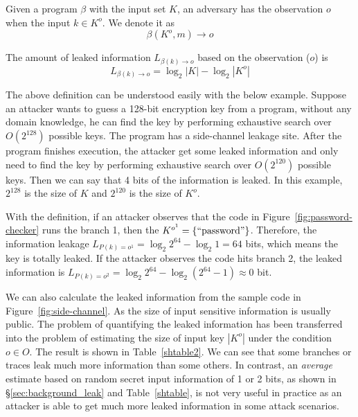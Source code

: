 \begin{mydef}
    \label{def}
    Given a program $\beta$ with the input set $K$,
    an adversary has the observation $o$ when the input $k{\in}K^o$.
    We denote it as
    $$\beta(K^o, m) \rightarrow	o$$

    The amount of leaked information $L_{\beta(k)\rightarrow o}$ based on the observation ($o$) is
    $$L_{\beta(k)\rightarrow o} = \log_2{|K|} - \log_2{|K^o|}$$
\end{mydef}

The above definition can be understood easily with the below example. Suppose an attacker
wants to guess a 128-bit encryption key from a program,
without any domain knowledge, 
he can find the key by performing exhaustive search over $O(2^{128})$ possible keys. 
The program has a side-channel leakage site. After the program finishes execution, the
attacker get some leaked information and only need to find the key by performing 
exhaustive search over $O(2^{120})$ possible keys. Then we can say that 4 bits of the information
is leaked. In this example, $2^{128}$ is the size of $K$ and $2^{120}$ is the size of $K^o$.


With the definition, if an attacker observes that the code in
Figure~\ref{fig:password-checker} runs the branch 1, then the $K^{o^{1}} =
\{\mathrm{``password"}\}$. Therefore, the information leakage $L_{P(k)=o^{1}} =
\log_2{2^{64}} - \log_2{1} = 64$ bits, which means the key is totally leaked. If
the attacker observes the code hits branch 2, the leaked information is
$L_{P(k)=o^{2}} = \log_2{2^{64}} - \log_2{(2^{64}-1)} \approx 0$ bit.


We can also calculate the leaked information from the sample code in
Figure~\ref{fig:side-channel}. As the size of input sensitive information is
usually public. The problem of quantifying the leaked information has been
transferred into the problem of estimating the size of input key $|K^o|$ under
the condition $o \in O$. The result is shown in Table~\ref{shtable2}. We can see
that some branches or traces leak much more information than some others. In
contrast, an \emph{average} estimate based on random secret input information of
1 or 2 bits, as shown in \S\ref{sec:background_leak} and Table~\ref{shtable}, is
not very useful in practice as an attacker is able to get much more leaked
information in some attack scenarios.

